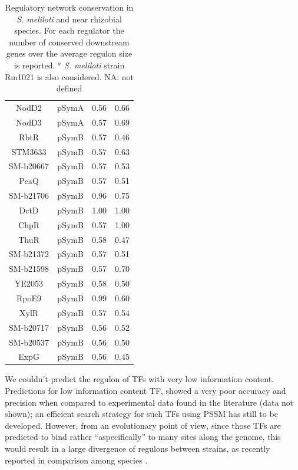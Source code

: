 \begin{table}[!ht]
\begin{tabular}{ c c c c }
NodD2     & pSymA         & 0.56        & 0.66          \\
NodD3     & pSymA         & 0.57        & 0.69          \\
RbtR      & pSymB         & 0.57        & 0.46          \\
STM3633   & pSymB         & 0.57        & 0.63          \\
SM-b20667 & pSymB         & 0.57        & 0.53          \\
PcaQ      & pSymB         & 0.57        & 0.51          \\
SM-b21706 & pSymB         & 0.96        & 0.75          \\
DctD      & pSymB         & 1.00        & 1.00          \\
ChpR      & pSymB         & 0.57        & 1.00          \\
ThuR      & pSymB         & 0.58        & 0.47          \\
SM-b21372 & pSymB         & 0.57        & 0.51          \\
SM-b21598 & pSymB         & 0.57        & 0.70          \\
YE2053    & pSymB         & 0.58        & 0.50          \\
RpoE9     & pSymB         & 0.99        & 0.60          \\
XylR      & pSymB         & 0.57        & 0.54          \\
SM-b20717 & pSymB         & 0.56        & 0.52          \\
SM-b20537 & pSymB         & 0.56        & 0.50          \\
ExpG      & pSymB         & 0.56        & 0.45         \\
\hline
\end{tabular}
\caption{\label{tab:regulonconservation} Regulatory network conservation in \textit{S. meliloti} and near rhizobial species. For each regulator the number of conserved downstream genes over the average regulon size is reported. $^{a}$ \textit{S. meliloti} strain Rm1021 is also considered. NA: not defined}
\end{table}

We couldn't predict the regulon of TFs with very low information content.\\
Predictions for low information content TF, showed a very poor accuracy and precision when compared to experimental data found in the literature (data not shown); an efficient search strategy for such TFs using PSSM has still to be developed. However, from an evolutionary point of view, since those TFs are predicted to bind rather “aspecifically” to many sites along the genome, this would result in a large divergence of regulons between strains, as recently reported in comparison among species \cite{quinn2014bacterial}.\\

